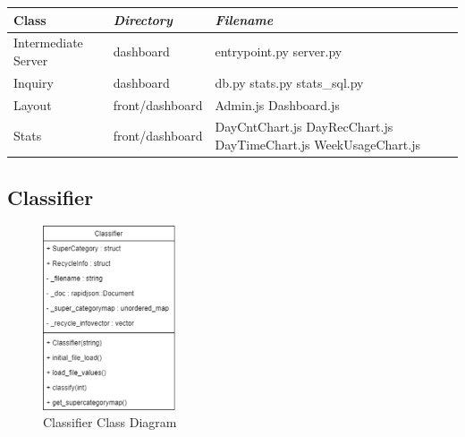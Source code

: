 \documentclass[conference]{IEEEtran}
\begin{document}
\begin{table}[htbp!]\normalsize
\begin{center}
\begin{tabular}{|p{1.8cm}|p{2.2cm}|p{3.6cm}|}
\hline
\textbf{Class} & \textbf{\textit{Directory}}& \textbf{\textit{Filename}}\\
\hline
Intermediate Server & dashboard & entrypoint.py
\newline
server.py
\newline
\\ \hline
Inquiry & dashboard & db.py
\newline
stats.py
\newline
stats\_sql.py
\newline
\\ \hline
Layout & front/dashboard & Admin.js
\newline
Dashboard.js
\newline
\\ \hline
Stats & front/dashboard & DayCntChart.js
\newline
DayRecChart.js
\newline
DayTimeChart.js
\newline
WeekUsageChart.js
\newline
\\ \hline
\end{tabular}
\label{tab1}
\end{center}
\end{table}

\newpage
\subsection{Classifier}

\begin{figure}[h]
    \centering
    \includegraphics[width=0.35\textwidth]{images/code_diagrams/classifier_uml.eps}
    \caption{Classifier Class Diagram}
\end{figure}~\\
\end{document}
